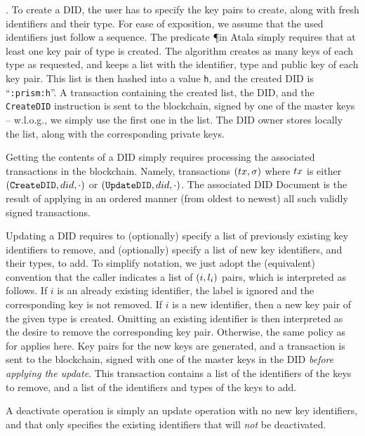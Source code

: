 \begin{description}
\item{.} %
  To create a DID, the user has to specify the key pairs to create, along with
  fresh identifiers and their type. For ease of exposition, we assume that the
  used identifiers just follow a sequence. The predicate \P in Atala simply
  requires that at least one key pair of \MasterKey type is created. The
   algorithm creates as many keys of each type as requested,
  and keeps a list with the identifier, type and public key of each key pair.
  This list is then hashed into a value \texttt{h}, and the created DID is
  ``\texttt{\did:prism:h}''. A transaction containing the created list, the
  DID, and the \texttt{CreateDID} instruction is sent to the blockchain,
  signed by one of the master keys -- w.l.o.g., we simply use the first one
  in the list. The DID owner stores locally the list, along with the
  corresponding private keys.
\item[\uccmd{Read}.] %
  Getting the contents of a DID simply requires processing the associated
  transactions in the blockchain. Namely, transactions $(tx,\sigma)$ where $tx$
  is either $(\texttt{CreateDID},did,\cdot)$ or $(\texttt{UpdateDID},did,
  \cdot)$. The associated DID Document is the result of applying in an ordered
  manner (from oldest to newest) all such validly signed transactions.
\item[\uccmd{Update}.] %
  Updating a DID requires to (optionally) specify a list of previously existing
  key identifiers to remove, and (optionally) specify a list of new key
  identifiers, and their types, to add. To simplify notation, we just adopt the
  (equivalent) convention that the caller indicates a list of $(i,l_i)$
  pairs, which is interpreted as follows. If $i$ is an already existing
  identifier, the label is ignored and the corresponding key is not removed. If
  $i$ is a new identifier, then a new key pair of the given type is created.
  Omitting an existing identifier is then interpreted as the desire to remove
  the corresponding key pair. Otherwise, the same policy as for 
  applies here. Key pairs for the new keys are generated, and a transaction is
  sent to the blockchain, signed with one of the master keys in the DID
  \emph{before applying the update}. This transaction contains a list of the
  identifiers of the keys to remove, and a list of the identifiers and types
  of the keys to add.
\item[\uccmd{Deactivate}.] %
  A deactivate operation is simply an update operation with no new key
  identifiers, and that only specifies the existing identifiers that will
  \emph{not} be deactivated.
\end{description}

